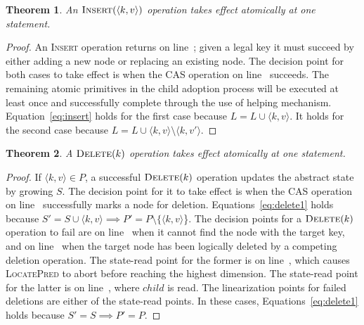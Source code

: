 \documentclass[10pt,conference,compsocconf]{IEEEtran}
\newtheorem{theorem}{Theorem}
\begin{document}
\begin{theorem}
    An $\textsc{Insert}(\langle k,v\rangle)$ operation takes effect atomically at one statement.
\end{theorem}
\begin{proof}
    An \textsc{Insert} operation returns on line~; given a legal key it must succeed by either adding a new node or replacing an existing node.
    The decision point for both cases to take effect is when the CAS operation on line~ succeeds.
    The remaining atomic primitives in the child adoption process will be executed at least once and successfully complete through the use of helping mechanism.
    Equation~\ref{eq:insert} holds for the first case because $L=L\cup \langle k,v \rangle$.
    It holds for the second case because $L=L\cup \langle k,v \rangle \setminus \langle k,v' \rangle$.
\end{proof}

\begin{theorem}
    A $\textsc{Delete}(k)$ operation takes effect atomically at one statement.
\end{theorem}
\begin{proof}
    If $\langle k,v \rangle \in P$, a successful $\textsc{Delete}(k)$ operation updates the abstract state by growing $S$.
    The decision point for it to take effect is when the CAS operation on line~ successfully marks a node for deletion.
    Equations~\ref{eq:delete1} holds because $S' = S \cup \langle k,v \rangle \implies P' = P \setminus \{\langle k,v \rangle$\}.
    The decision points for a $\textsc{Delete}(k)$ operation to fail are on line~ when it cannot find the node with the target key, and on line~ when the target node has been logically deleted by a competing deletion operation.
    The state-read point for the former is on line~, which causes \textsc{LocatePred} to abort before reaching the highest dimension.
    The state-read point for the latter is on line~, where $child$ is read.
    The linearization points for failed deletions are either of the state-read points.
    In these cases, Equations~\ref{eq:delete1} holds because $S' = S \implies P' = P$.
\end{proof}
\end{document}

